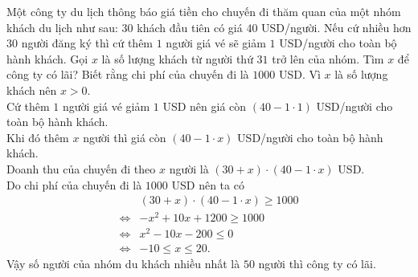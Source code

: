 \begin{bt}%
Một công ty du lịch thông báo giá tiền cho chuyến đi thăm quan của một nhóm khách du lịch như sau: $30$ khách đầu tiên có giá $40$ USD/người. Nếu cứ nhiều hơn $30$ người đăng ký thì cứ thêm $1$ người giá vé sẽ giảm $1$ USD/người cho toàn bộ hành khách. Gọi $x$ là số lượng khách từ người thứ $31$ trở lên của nhóm. Tìm $x$ để công ty có lãi? Biết rằng chi phí của chuyến đi là $1000$ USD.
\loigiai
{
Vì $x$ là số lượng khách nên $x>0$.\\
Cứ thêm $1$ người giá vé giảm $1$ USD nên giá còn $(40-1\cdot1)$ USD/người cho toàn bộ hành khách.\\
Khi đó thêm $x$ người thì giá còn $(40-1\cdot x)$ USD/người cho toàn bộ hành khách.\\
Doanh thu của chuyến đi theo $x$ người là $(30+x)\cdot (40-1\cdot x)$ USD.\\
Do chi phí của chuyến đi là $1000$ USD nên ta có 
\begin{align*}
&(30+x)\cdot (40-1\cdot x)\geq 1000\\ \Leftrightarrow& -x^2+10x+1200\geq 1000\\ \Leftrightarrow &x^2-10x-200\leq 0\\ \Leftrightarrow & -10\leq x \leq 20.
\end{align*}
Vậy số người của nhóm du khách nhiều nhất là $50$ người thì công ty có lãi.
}
\end{bt}

